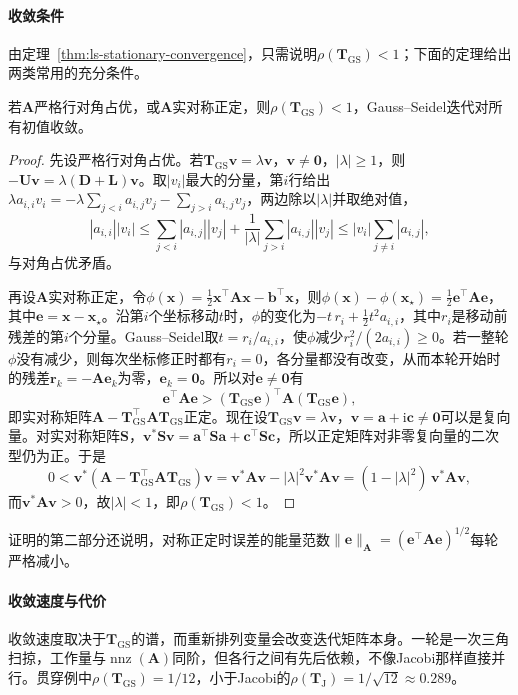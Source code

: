 \paragraph{收敛条件}
由定理~\ref{thm:ls-stationary-convergence}，只需说明$\rho(\bm T_{\mathrm{GS}})<1$；下面的定理给出两类常用的充分条件。
\begin{theorem}
\label{thm:ls-gauss-seidel-convergence}
若$\bm A$严格行对角占优，或$\bm A$实对称正定，则$\rho(\bm T_{\mathrm{GS}})<1$，Gauss--Seidel迭代对所有初值收敛。
\end{theorem}
\begin{proof}
先设严格行对角占优。若$\bm T_{\mathrm{GS}}\bm v=\lambda\bm v$，$\bm v\neq\bm 0$，$|\lambda|\geq1$，则$-\bm U\bm v=\lambda(\bm D+\bm L)\bm v$。取$|v_i|$最大的分量，第$i$行给出$\lambda a_{i,i}v_i=-\lambda\sum_{j<i}a_{i,j}v_j-\sum_{j>i}a_{i,j}v_j$，两边除以$|\lambda|$并取绝对值，
\[
|a_{i,i}||v_i|\leq\sum_{j<i}|a_{i,j}||v_j|+\frac{1}{|\lambda|}\sum_{j>i}|a_{i,j}||v_j|
\leq|v_i|\sum_{j\neq i}|a_{i,j}|,
\]
与对角占优矛盾。

再设$\bm A$实对称正定，令$\phi(\bm x)=\tfrac12\bm x^\top\bm A\bm x-\bm b^\top\bm x$，则$\phi(\bm x)-\phi(\bm x_\star)=\tfrac12\bm e^\top\bm A\bm e$，其中$\bm e=\bm x-\bm x_\star$。沿第$i$个坐标移动$t$时，$\phi$的变化为$-t\,r_i+\tfrac12t^2a_{i,i}$，其中$r_i$是移动前残差的第$i$个分量。Gauss--Seidel取$t=r_i/a_{i,i}$，使$\phi$减少$r_i^2/(2a_{i,i})\geq0$。若一整轮$\phi$没有减少，则每次坐标修正时都有$r_i=0$，各分量都没有改变，从而本轮开始时的残差$\bm r_k=-\bm A\bm e_k$为零，$\bm e_k=\bm0$。所以对$\bm e\neq\bm 0$有
\[
\bm e^\top\bm A\bm e>(\bm T_{\mathrm{GS}}\bm e)^\top\bm A(\bm T_{\mathrm{GS}}\bm e),
\]
即实对称矩阵$\bm A-\bm T_{\mathrm{GS}}^\top\bm A\bm T_{\mathrm{GS}}$正定。现在设$\bm T_{\mathrm{GS}}\bm v=\lambda\bm v$，$\bm v=\bm a+\mathrm i\bm c\neq\bm 0$可以是复向量。对实对称矩阵$\bm S$，$\bm v^*\bm S\bm v=\bm a^\top\bm S\bm a+\bm c^\top\bm S\bm c$，所以正定矩阵对非零复向量的二次型仍为正。于是
\[
0<\bm v^*(\bm A-\bm T_{\mathrm{GS}}^\top\bm A\bm T_{\mathrm{GS}})\bm v
=\bm v^*\bm A\bm v-|\lambda|^2\bm v^*\bm A\bm v
=(1-|\lambda|^2)\,\bm v^*\bm A\bm v ,
\]
而$\bm v^*\bm A\bm v>0$，故$|\lambda|<1$，即$\rho(\bm T_{\mathrm{GS}})<1$。
\end{proof}
证明的第二部分还说明，对称正定时误差的能量范数$\lVert\bm e\rVert_{\bm A}=(\bm e^\top\bm A\bm e)^{1/2}$每轮严格减小。

\paragraph{收敛速度与代价}
收敛速度取决于$\bm T_{\mathrm{GS}}$的谱，而重新排列变量会改变迭代矩阵本身。一轮是一次三角扫掠，工作量与$\operatorname{nnz}(\bm A)$同阶，但各行之间有先后依赖，不像Jacobi那样直接并行。贯穿例中$\rho(\bm T_{\mathrm{GS}})=1/12$，小于Jacobi的$\rho(\bm T_{\mathrm J})=1/\sqrt{12}\approx0.289$。

